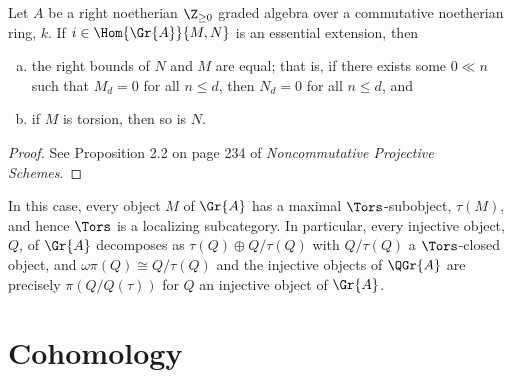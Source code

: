 \documentclass[10pt]{amsart}
\begin{document}
\begin{prop}
  Let $A$ be a right noetherian $\Z_{\geq 0}$ graded algebra over a commutative noetherian ring, $k$.
  If $i \in \Hom{\Gr{A}}{M, N}$ is an essential extension, then
  \begin{enumerate}[(a)]
  \item
    the right bounds of $N$ and $M$ are equal; that is, if there exists some $0 \ll n$ such that $M_d = 0$ for all $n \leq d$, then $N_d = 0$ for all $n \leq d$, and
  \item
    if $M$ is torsion, then so is $N$.
  \end{enumerate}
  \begin{proof}
    See Proposition 2.2 on page 234 of {\it Noncommutative Projective Schemes}.
  \end{proof}
\end{prop}

\begin{rmk}
  In this case, every object $M$ of $\Gr{A}$ has a maximal $\Tors$-subobject, $\tau(M)$, and hence $\Tors$ is a localizing subcategory.
  In particular, every injective object, $Q$, of $\Gr{A}$ decomposes as $\tau(Q) \oplus Q/\tau(Q)$ with $Q/\tau(Q)$ a $\Tors$-closed object, and $\omega\pi(Q) \cong Q/\tau(Q)$ and
  the injective objects of $\QGr{A}$ are precisely $\pi(Q/Q(\tau))$ for $Q$ an injective object of $\Gr{A}$.
\end{rmk}

\section{Cohomology}
\end{document}
